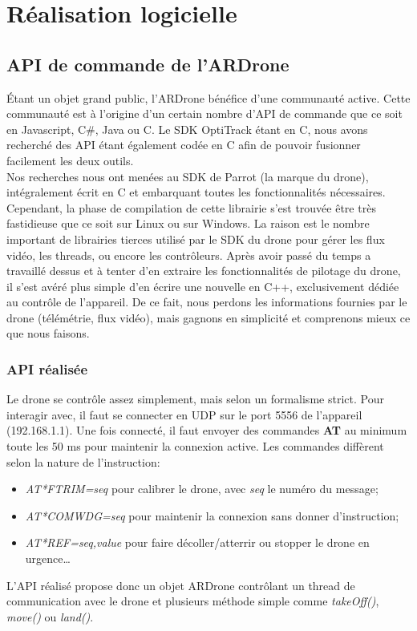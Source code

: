 \chapter{Réalisation logicielle}

    \section{API de commande de l'ARDrone}
        Étant un objet grand public, l'ARDrone bénéfice d'une communauté active. Cette communauté est à l'origine d'un certain nombre d'API de commande que ce soit en Javascript, C\#, Java ou C. Le SDK OptiTrack étant en C, nous avons recherché des API étant également codée en C afin de pouvoir fusionner facilement les deux outils.\\

        Nos recherches nous ont menées au SDK de Parrot (la marque du drone), intégralement écrit en C et embarquant toutes les fonctionnalités nécessaires. Cependant, la phase de compilation de cette librairie s'est trouvée être très fastidieuse que ce soit sur Linux ou sur Windows. La raison est le nombre important de librairies tierces utilisé par le SDK du drone pour gérer les flux vidéo, les threads, ou encore les contrôleurs. Après avoir passé du temps a travaillé dessus et à tenter d'en extraire les fonctionnalités de pilotage du drone, il s'est avéré plus simple d'en écrire une nouvelle en C++, exclusivement dédiée au contrôle de l'appareil. De ce fait, nous perdons les informations fournies par le drone (télémétrie, flux vidéo), mais gagnons en simplicité et comprenons mieux ce que nous faisons.

        \subsection{API réalisée}
            Le drone se contrôle assez simplement, mais selon un formalisme strict. Pour interagir avec, il faut se connecter en UDP sur le port 5556 de l'appareil (192.168.1.1). Une fois connecté, il faut envoyer des commandes \textbf{AT} au minimum toute les 50 ms pour maintenir la connexion active. Les commandes diffèrent selon la nature de l'instruction:
            \begin{itemize}
                \item \textit{AT*FTRIM=seq} pour calibrer le drone, avec \textit{seq} le numéro du message;
                \item \textit{AT*COMWDG=seq} pour maintenir la connexion sans donner d'instruction;
                \item \textit{AT*REF=seq,value} pour faire décoller/atterrir ou stopper le drone en urgence…
            \end{itemize}
            L'API réalisé propose donc un objet ARDrone contrôlant un thread de communication avec le drone et plusieurs méthode simple comme \textit{takeOff()}, \textit{move()} ou \textit{land()}.


